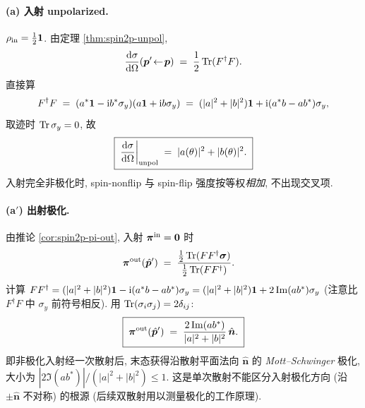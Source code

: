 \paragraph{(a) 入射 unpolarized.} $\rho_{\rm in}=\tfrac12\mathbf 1$. 由定理 \ref{thm:spin2p-unpol},
\begin{equation}
  \frac{\mathrm{d}\sigma}{\mathrm{d}\Omega}(\bm p'\!\leftarrow\!\bm p)
  \;=\;\frac{1}{2}\operatorname{Tr}(F^\dagger F).
\end{equation}
直接算
\begin{equation}
  F^\dagger F\;=\;(a^*\mathbf 1-\mathrm{i} b^*\sigma_y)(a\mathbf 1+\mathrm{i} b\sigma_y)
  \;=\;(|a|^2+|b|^2)\mathbf 1+\mathrm{i}(a^*b-ab^*)\sigma_y,
\end{equation}
取迹时 $\operatorname{Tr}\sigma_y=0$, 故
\begin{equation}
  \boxed{\;\frac{\mathrm{d}\sigma}{\mathrm{d}\Omega}\bigg|_{\rm unpol}\;=\;|a(\theta)|^2+|b(\theta)|^2.\;}
  \label{eq:spin2p-ex1-unpol}
\end{equation}
入射完全非极化时, spin-nonflip 与 spin-flip 强度按等权\emph{相加}, 不出现交叉项.

\paragraph{(a$'$) 出射极化.} 由推论 \ref{cor:spin2p-pi-out}, 入射 $\bm\pi^{\rm in}=\bm 0$ 时
\begin{align}
  \bm\pi^{\rm out}(\hat{\bm p}')\;
  &=\;\frac{\tfrac12\operatorname{Tr}(F F^\dagger\bm\sigma)}{\tfrac12\operatorname{Tr}(FF^\dagger)}.
\end{align}
计算 $FF^\dagger=(|a|^2+|b|^2)\mathbf 1-\mathrm{i}(a^*b-ab^*)\sigma_y=(|a|^2+|b|^2)\mathbf 1+2\Im(a b^*)\sigma_y$ (注意比 $F^\dagger F$ 中 $\sigma_y$ 前符号相反). 用 $\operatorname{Tr}(\sigma_i\sigma_j)=2\delta_{ij}$:
\begin{equation}
  \boxed{\;\bm\pi^{\rm out}(\hat{\bm p}')\;=\;\frac{2\Im(ab^*)}{|a|^2+|b|^2}\,\hat{\bm n}.\;}
  \label{eq:spin2p-ex1-piout-unpol}
\end{equation}
即非极化入射经一次散射后, 末态获得沿散射平面法向 $\hat{\bm n}$ 的 \emph{Mott--Schwinger} 极化, 大小为 $|2\Im(a b^*)|/(|a|^2+|b|^2)\le 1$. 这是单次散射不能区分入射极化方向 (沿 $\pm\hat{\bm n}$ 不对称) 的根源 (后续双散射用以测量极化的工作原理).

